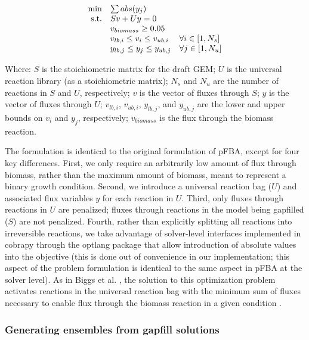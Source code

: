 \documentclass[11pt,twocolumn,notitlepage,openany,twoside]{book}
\begin{document}
\begin{refsection}
\begin{equation*}
\begin{array}{rlll}
\min & \multicolumn{2}{l} {\sum abs(y_j) } \\
\textrm{s.t.} &	Sv + Uy = 0	 \\
&	v_{biomass} \geq 0.05 \\
&	v_{lb,i} \leq v_i \leq v_{ub,i}	& 	\forall i \in [1, N_s] \\
&	y_{lb,j} \leq y_j \leq y_{ub,j}	&	\forall j \in [1, N_u] \\
\end{array}
\end{equation*}

Where:
  $S$ is the stoichiometric matrix for the draft GEM;
	$U$ is the universal reaction library (as a stoichiometric matrix);
	$N_s$ and $N_u$ are the number of reactions in $S$ and $U$, respectively;
	$v$ is the vector of fluxes through $S$;
 	$y$ is the vector of fluxes through $U$;
	$v_{lb,i}$, $v_{ub,i}$, $y_{lb,j}$, and $y_{ub,j}$ are the lower and upper bounds on $v_i$ and $y_j$, respectively;
	$v_{biomass}$ is the flux through the biomass reaction.

The formulation is identical to the original formulation of pFBA, except for four key differences. First, we only require an arbitrarily low amount of flux through biomass, rather than the maximum amount of biomass, meant to represent a binary growth condition. Second, we introduce a universal reaction bag ($U$) and associated flux variables $y$ for each reaction in $U$. Third, only fluxes through reactions in $U$ are penalized; fluxes through reactions in the model being gapfilled ($S$) are not penalized. Fourth, rather than explicitly splitting all reactions into irreversible reactions, we take advantage of solver-level interfaces implemented in cobrapy through the optlang package \cite{Jensen2016-nu} that allow introduction of absolute values into the objective (this is done out of convenience in our implementation; this aspect of the problem formulation is identical to the same aspect in pFBA at the solver level). As in Biggs et al. , the solution to this optimization problem activates reactions in the universal reaction bag with the minimum sum of fluxes necessary to enable flux through the biomass reaction in a given condition \cite{Biggs2017-md}.

\subsubsection{Generating ensembles from gapfill solutions}


\end{refsection}
\end{document}
